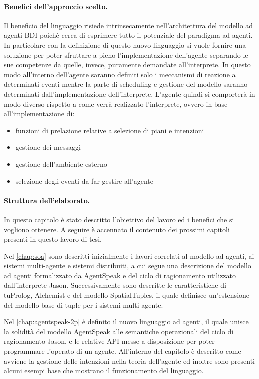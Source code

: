 \paragraph{Benefici dell'approccio scelto.}
Il beneficio del linguaggio risiede intrinsecamente nell'architettura del modello ad agenti BDI poichè cerca di esprimere tutto il potenziale del paradigma ad agenti.
In particolare con la definizione di questo nuovo linguaggio si vuole fornire una soluzione per poter sfruttare a pieno l'implementazione dell'agente separando le sue competenze da quelle, invece, puramente demandate all'interprete.
In questo modo all'interno dell'agente saranno definiti solo i meccanismi di reazione a determinati eventi mentre la parte di scheduling e gestione del modello saranno determinati dall'implementazione dell'interprete.
L'agente quindi si comporterà in modo diverso rispetto a come verrà realizzato l'interprete, ovvero in base all'implementazione di:
\begin{itemize}
\item funzioni di prelazione relative a selezione di piani e intenzioni
\item gestione dei messaggi
\item gestione dell'ambiente esterno
\item selezione degli eventi da far gestire all'agente
\end{itemize}

\paragraph{Struttura dell'elaborato.}
In questo capitolo è stato descritto l'obiettivo del lavoro ed i benefici che si vogliono ottenere.
A seguire è accennato il contenuto dei prossimi capitoli presenti in questo lavoro di tesi.

Nel \cref{chap:soa} sono descritti inizialmente i lavori correlati al modello ad agenti, ai sistemi multi-agente e sistemi distribuiti, a cui segue una descrizione del modello ad agenti formalizzato da AgentSpeak e del ciclo di ragionamento utilizzato dall'interprete Jason.
Successivamente sono descritte le caratteristiche di tuProlog, Alchemist e del modello SpatialTuples, il quale definisce un'estensione del modello base di tuple per i sistemi multi-agente.

Nel \cref{chap:agentspeak-2p} è definito il nuovo linguaggio ad agenti, il quale unisce la solidità del modello AgentSpeak alle semantiche operazionali del ciclo di ragionamento Jason, e le relative API messe a disposizione per poter programmare l'operato di un agente.
All'interno del capitolo è descritto come avviene la gestione delle intenzioni nella teoria dell'agente ed inoltre sono presenti alcuni esempi base che mostrano il funzionamento del linguaggio.

